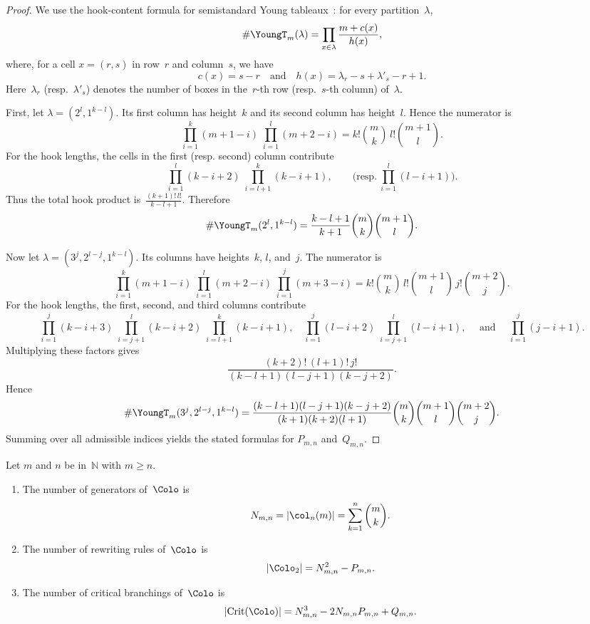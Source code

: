 \documentclass[a4paper, twoside, 11pt, english]{article}
\begin{document}
\begin{proof}
We use the hook-content formula for semistandard Young tableaux~\cite[Theorem~7.21.2]{StanleyEC2}:
for every partition~$\lambda$,
\[\displaystyle 
\#\YoungT_m(\lambda)
=
\prod_{x\in\lambda}\frac{m+c(x)}{h(x)},
\]
where, for a cell $x=(r,s)$ in row~$r$ and column~$s$, we have
\[
c(x)=s-r
\quad
\text{and}
\quad
h(x)=\lambda_r-s+\lambda'_s-r+1.
\]
Here~$\lambda_r$ (resp.~$\lambda'_s$) denotes the number of boxes in the~$r$-th row (resp.~$s$-th column) of~$\lambda$.

First, let $\lambda=(2^l,1^{k-l})$.
Its first column has height~$k$ and its second column has height~$l$.
Hence the numerator is
\[\displaystyle 
\prod_{i=1}^{k}(m+1-i)\;\prod_{i=1}^{l}(m+2-i)
=
k!\binom{m}{k}\,l!\binom{m+1}{l}.
\]
For the hook lengths, the cells in the first (resp. second) column contribute
\[\displaystyle 
\prod_{i=1}^{l}(k-i+2)\;\prod_{i=l+1}^{k}(k-i+1),
\qquad
\big(
\text{resp.}~\prod_{i=1}^{l}(l-i+1)
\big).
\]
Thus the total hook product is~$\displaystyle \frac{(k+1)!\,l!}{k-l+1}$.
Therefore
\[\displaystyle 
\#\YoungT_m(2^l,1^{k-l})
=
\frac{k-l+1}{k+1}\binom{m}{k}\binom{m+1}{l}.
\]

Now let $\lambda=(3^j,2^{l-j},1^{k-l})$.
Its columns have heights~$k$, $l$, and~$j$.
The numerator is
\[
\prod_{i=1}^{k}(m+1-i)\;
\prod_{i=1}^{l}(m+2-i)\;
\prod_{i=1}^{j}(m+3-i)
=
k!\binom{m}{k}\,l!\binom{m+1}{l}\,j!\binom{m+2}{j}.
\]
For the hook lengths, the first, second, and third columns contribute
\[
\prod_{i=1}^{j}(k-i+3)\;
\prod_{i=j+1}^{l}(k-i+2)\;
\prod_{i=l+1}^{k}(k-i+1),
\quad
\prod_{i=1}^{j}(l-i+2)\;
\prod_{i=j+1}^{l}(l-i+1),
\quad
\text{ and }
\quad
\prod_{i=1}^{j}(j-i+1).
\]
Multiplying these factors gives
\[
\frac{(k+2)!\,(l+1)!\,j!}
{(k-l+1)(l-j+1)(k-j+2)}.
\]
Hence
\[
\#\YoungT_m(3^j,2^{l-j},1^{k-l})
=
\frac{(k-l+1)(l-j+1)(k-j+2)}
{(k+1)(k+2)(l+1)}
\binom{m}{k}\binom{m+1}{l}\binom{m+2}{j}.
\]
Summing over all admissible indices yields the stated formulas for
$P_{m,n}$ and~$Q_{m,n}$.
\end{proof}

\begin{proposition}
\label{prop:counting-final}
Let $m$ and $n$ be in~$\mathbb N$ with $m\ge n$.
\begin{enumerate}[\bf i)]
\item The number of generators of~$\Colo$ is
\[
N_{m,n}= |\col_n(m)|=\sum_{k=1}^{n}\binom{m}{k}.
\]

\item The number of rewriting rules of~$\Colo$ is
\[
|\Colo_2|=N_{m,n}^2-P_{m,n}.
\]

\item The number of critical branchings of~$\Colo$ is
\[
|\mathrm{Crit}(\Colo)|
=
N_{m,n}^3-2N_{m,n}P_{m,n}+Q_{m,n}.
\]
\end{enumerate}
\end{proposition}
\end{document}
